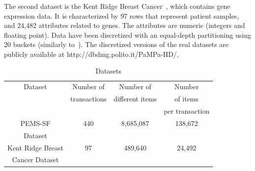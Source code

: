 The second dataset is the Kent Ridge Breast Cancer~\cite{breast_cancer_dataset}, 
which contains gene expression data.
It is characterized by 97 rows that represent patient samples, 
and 24,482 attributes related to genes.
The attributes are numeric (integers and floating point).
Data have been discretized with an equal-depth partitioning
using 20 buckets (similarly to~\cite{Zaki_Carpenter}).
The discretized versions of the real datasets
are publicly available at http://dbdmg.polito.it/PaMPa-HD/.




\begin{table}[h!]
\begin{center}
\caption{Datasets}
\label{datasets}
\begin{tabular}{|c|c|c|c|}
\hline
	Dataset & Number of  & Number of & Number  \\
	 & transactions &different items & of items  \\
	  &  & &  per transaction  \\ \hline \hline

PEMS-SF    & 440& 8,685,087     & 138,672 \\
       Dataset      &  &          &  \\ \hline
     Kent Ridge Breast    & 97 & 489,640    & 24,492 \\
     Cancer Dataset      &    &            &  \\ \hline
\end{tabular}
\end{center}
\end{table}


